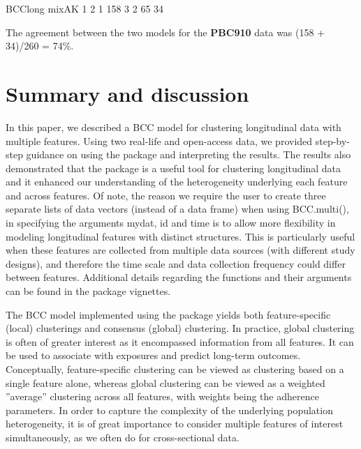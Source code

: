 \begin{example}
     BCClong
mixAK   1   2
    1 158   3
    2  65  34
\end{example}
The agreement between the two models for the \textbf{PBC910} data was (158 + 34)/260 = 74\%.

\section{Summary and discussion} \label{sec:summary}
In this paper, we described a BCC model for clustering longitudinal data with multiple features. Using two real-life and open-access data, we provided step-by-step guidance on using the  package and interpreting the results. The results also demonstrated that the  package is a useful tool for clustering longitudinal data and it enhanced our understanding of the heterogeneity underlying each feature and across features. Of note, the reason we require the user to create three separate lists of data vectors (instead of a data frame) when using BCC.multi(), in specifying the arguments mydat, id and time is to allow more flexibility in modeling longitudinal features with distinct structures.  This is particularly useful when these features are collected from multiple data sources (with different study designs), and therefore the time scale and data collection frequency could differ between features. Additional details regarding the functions and their arguments can be found in the package vignettes.

The BCC model implemented using the  package yields both feature-specific (local) clusterings and consensus (global) clustering. In practice, global clustering is often of greater interest as it encompassed information from all features.  It can be used to associate with exposures and predict long-term outcomes. Conceptually, feature-specific clustering can be viewed as clustering based on a single feature alone, whereas global clustering can be viewed as a weighted ”average” clustering across all features, with weights being the adherence parameters. In order to capture the complexity of the underlying population heterogeneity, it is of great importance to consider multiple features of interest simultaneously, as we often do for cross-sectional data. 

